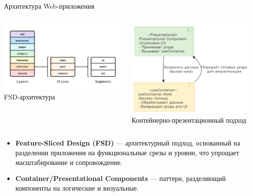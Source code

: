\documentclass[aspectratio=169]{beamer}
\begin{document}
\begin{frame}{Архитектура Web-приложения}
\begin{columns}
    \begin{column}{0.45\textwidth}
        \centering
        \includegraphics[width=0.8\linewidth]{static/fsd-diagram.png} \\
        \small FSD-архитектура
    \end{column}
    \begin{column}{0.45\textwidth}
        \centering
        \includegraphics[width=0.8\linewidth]{static/container-presentational.png} \\
        \small Контейнерно-презентационный подход
    \end{column}
\end{columns}

\vspace{0.5em}

\small
\begin{itemize}
  \item \textbf{Feature-Sliced Design (FSD)} — архитектурный подход, основанный на разделении приложения на функциональные срезы и уровни, что упрощает масштабирование и сопровождение.
  \item \textbf{Container/Presentational Components} — паттерн, разделяющий компоненты на логические и визуальные.
\end{itemize}

\end{frame}
\end{document}
